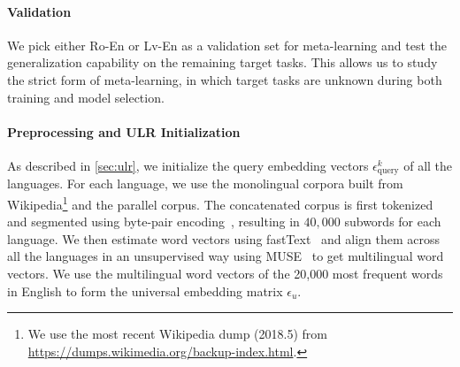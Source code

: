 \paragraph{Validation}

We pick either Ro-En or Lv-En as a validation set for meta-learning and test the generalization capability on the remaining target tasks. This allows us to study the strict form of meta-learning, in which target tasks are unknown during both training and model selection.




% 




\paragraph{Preprocessing and ULR Initialization}

As described in \textsection\ref{sec:ulr}, we initialize the query embedding vectors $\epsilon_{\text{query}}^k$ of all the languages. For each language, we use the monolingual corpora built from Wikipedia\footnote{
We use the most recent Wikipedia dump (2018.5) from \url{https://dumps.wikimedia.org/backup-index.html}. 
}
and the parallel corpus. The concatenated corpus is first tokenized and segmented using byte-pair encoding~\citep[BPE,][]{sennrich2016edinburgh}, resulting in $40,000$ subwords for each language. We then estimate word vectors using fastText~\citep{bojanowski2016enriching} and align them across all the languages in an unsupervised way using MUSE~\citep{alexis2018word} to get multilingual word vectors. We use the multilingual word vectors of the 20,000 most frequent words in English to form the universal embedding matrix $\epsilon_u$. 



